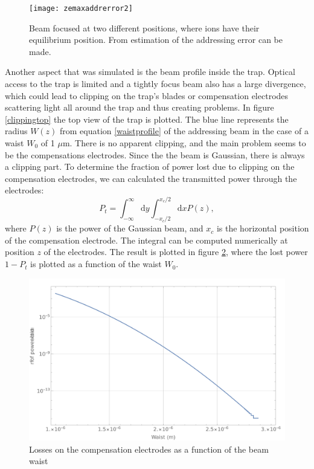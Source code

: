  \begin{figure}
 \centering
 \texttt{[image: zemaxaddrerror2]}
 \caption{Beam focused at two different positions, where ions have their equilibrium position. From estimation of the addressing error can be made.}
 \label{zemaxaddrerror.png}
 \end{figure}
Another aspect that was simulated is the beam profile inside the trap. Optical access to the trap is limited and a tightly focus beam also has a large divergence, which could lead to clipping on the trap's blades or compensation electrodes scattering light all around the trap and thus creating problems. In figure \ref{clippingtop} the top view of the trap is plotted. The blue line represents the radius $W(z)$ from equation \ref{waistprofile} of the addressing beam in the case of a waist $W_0$ of 1 $\mu$m. There is no apparent clipping, and the main problem seems to be the compensations electrodes. Since the the beam is Gaussian, there is always a clipping part. To determine the fraction of power lost due to clipping on the compensation electrodes, we can calculated the transmitted power through the electrodes:
\begin{equation}
P_{t} = \int_{-\infty}^{\infty}\text{d}y \int_{-x_c/2}^{x_c/2}\text{d}x P(z),
\end{equation}
where $P(z)$ is the power of the Gaussian beam, and $x_c$ is the horizontal position of the compensation electrode. The integral can be computed numerically at position $z$ of the electrodes. The result is plotted in figure \ref{lossesplot}, where the lost power $1-P_{t}$ is plotted as a function of the waist $W_0$.
\begin{figure}
      \centering
        \includegraphics[width=.8\textwidth]{img/clipping2}
        \caption{Losses on the compensation electrodes as a function of the beam waist}
        \label{lossesplot}

\end{figure}

